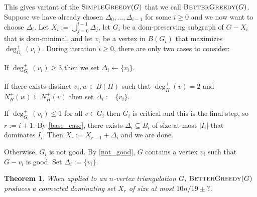 \documentclass[12pt]{article}
\newtheorem{thm}{Theorem}
\begin{document}
This gives variant of the $\textsc{SimpleGreedy}(G)$ that we call $\textsc{BetterGreedy}(G)$.  Suppose we have already chosen $\Delta_0,\ldots,\Delta_{i-1}$ for some $i\ge 0$ and we now want to choose $\Delta_i$.  Let $X_i:=\bigcup_{j=0}^{i-1}\Delta_j$, let $G_i$ be a dom-preserving subgraph of $G-X_i$ that is dom-minimal, and let $v_i$ be a vertex in $B(G_i)$ that maximizes $\deg^+_{G_i}(v_i)$.  During iteration $i\ge 0$, there are only two cases to consider:  
\begin{compactenum}
    \item If $\deg^+_{G_i}(v_i)\ge 3$ then we set $\Delta_i\gets\{v_i\}$.
    \item If there exists distinct $v_i,w\in B(H)$ such that $\deg^+_H(v)=2$ and $N^+_H(w)\subseteq N^+_H(v)$ then set $\Delta_i:=\{v_i\}$.
    \item If $\deg^+_{G_i}(v_i)\le 1$ for all $v\in G_i$ then $G_i$ is critical and this is the final step, so $r:=i+1$.  By \cref{base_case}, there exists $\Delta_i\subseteq B_i$ of size at most $|I_i|$ that dominates $I_i$. Then $X_r:=X_{r-1}+\Delta_{i}$ and we are done.
    \item Otherwise, $G_i$ is not good.  By \cref{not_good}, $G$ contains a vertex $v_i$ such that $G-v_i$ is good.  Set $\Delta_i:=\{v_i\}$.
\end{compactenum}

\begin{thm}\label{better_greedy}
  When applied to an $n$-vertex triangulation $G$,  $\textsc{BetterGreedy}(G)$ produces a connected dominating set $X_r$ of size at most $10n/19\pm{?}$.
\end{thm}
\end{document}
